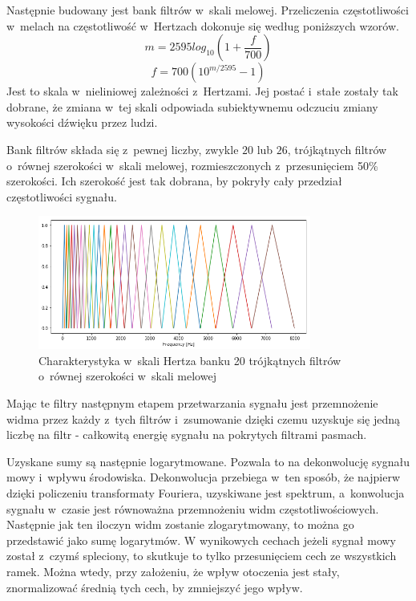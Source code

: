 Następnie budowany jest bank filtrów w~skali melowej. Przeliczenia częstotliwości w~melach na
częstotliwość w~Hertzach dokonuje się według poniższych wzorów.
$$m = 2595 log_{10}(1 + \frac{f}{700})$$
$$f = 700 (10^{m/2595} - 1)$$
Jest to skala w~nieliniowej zależności z~Hertzami. Jej postać i~stałe zostały tak dobrane,
że zmiana w~tej skali odpowiada subiektywnemu odczuciu zmiany wysokości dźwięku przez ludzi.

Bank filtrów składa się z~pewnej liczby, zwykle $20$ lub $26$, trójkątnych filtrów o~równej
szerokości w~skali melowej, rozmieszczonych z~przesunięciem 50\% szerokości. Ich szerokość
jest tak dobrana, by pokryły cały przedział częstotliwości sygnału.

\begin{figure}[H]
    \centering
    \includegraphics[width=0.8\textwidth]{images/2_1_d_mel_filters}
    \caption{Charakterystyka w~skali Hertza banku 20 trójkątnych filtrów o~równej szerokości w~skali melowej}
    \label{fig:2_1_d_mel_filters}
\end{figure}

Mając te filtry następnym etapem przetwarzania sygnału jest przemnożenie widma przez każdy z~tych filtrów i~zsumowanie
dzięki czemu uzyskuje się jedną liczbę na filtr - całkowitą energię sygnału na pokrytych filtrami pasmach.

Uzyskane sumy są następnie logarytmowane. Pozwala to na dekonwolucję sygnału mowy i~wpływu środowiska.
Dekonwolucja przebiega w~ten sposób, że najpierw dzięki policzeniu transformaty Fouriera,
uzyskiwane jest spektrum, a~konwolucja sygnału w~czasie jest równoważna przemnożeniu widm częstotliwościowych.
Następnie jak ten iloczyn widm zostanie zlogarytmowany, to można go przedstawić jako sumę logarytmów.
W wynikowych cechach jeżeli sygnał mowy został z~czymś spleciony, to skutkuje to tylko przesunięciem cech
ze wszystkich ramek. Można wtedy, przy założeniu, że wpływ otoczenia jest stały, znormalizować średnią tych cech,
by zmniejszyć jego wpływ.

